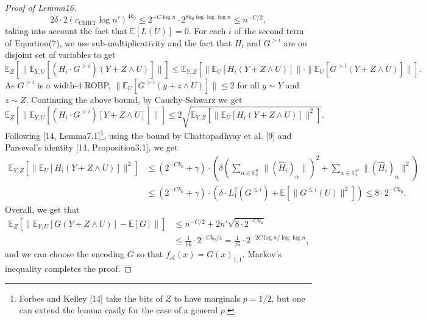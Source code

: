 \begin{proof}[Proof of Lemma16]
\[
2\delta\cdot2(c_{\mathrm{CHRT}}\log n')^{4k_0}
\le2^{-C\log n}\cdot2^{8k_0\log\log\log n}\le n^{-C/2},
\]
taking into account the fact that $\mathbb E[L(U)]=0$.
For each $i$ of the second term of Equation(7), we use sub-multiplicativity and the fact that $H_i$ and $G^{>i}$ are on disjoint set of variables to get
\[
\mathbb E_Z[\|\mathbb E_{Y,U}[(H_i\cdot G^{>i})(Y+Z\wedge U)]\|]
\le\mathbb E_{Y,Z}[\|\mathbb E_U[H_i(Y+Z\wedge U)]\|\cdot\|\mathbb E_U[G^{>i}(Y+Z\wedge U)]\|].
\]
As $G^{>i}$ is a width-4 ROBP, $\|\mathbb E_U[G^{>i}(y+z\wedge U)]\|\le2$ for all $y\sim Y$ and $z\sim Z$. Continuing the above bound, by Cauchy-Schwarz we get
\[
\mathbb E_Z[\|\mathbb E_{Y,U}[(H_i\cdot G^{>i})[Y+Z\wedge U]]\|]
\le2\sqrt{\mathbb E_{Y,Z}[\|\mathbb E_U[H_i(Y+Z\wedge U)]\|^2]}.
\]
Following [14, Lemma7.1]\footnote{Forbes and Kelley [14] take the bits of $Z$ to have marginals $p=1/2$, but one can extend the lemma easily for the case of a general $p$.}, using the bound by Chattopadhyay et al. [9] and Parseval's identity [14, Proposition3.1], we get
\begin{align*}
\mathbb E_{Y,Z}[\|\mathbb E_U[H_i(Y+Z\wedge U)]\|^2]
&\le(2^{-Ck_0}+\gamma)\cdot\left(\delta\left(\sum_{\alpha\in\mathbb F_2^{n'}}\|(\widehat H_i)_\alpha\|\right)^2+\sum_{\alpha\in\mathbb F_2^{n'}}\|(\widehat H_i)_\alpha\|^2\right)\\
&\le(2^{-Ck_0}+\gamma)\cdot\left(\delta\cdot L_1^2(G^{\le i})+\mathbb E[\|G^{\le i}(U)\|^2]\right)
\le8\cdot2^{-Ck_0}.
\end{align*}
Overall, we get that
\begin{align*}
\mathbb E_Z[\|\mathbb E_{Y,U}[G(Y+Z\wedge U)]-\mathbb E[G]\|]
&\le n^{-C/2}+2n'\sqrt{8\cdot2^{-Ck_0}}\\
&\le\frac1{16}\cdot2^{-Ck_0/4}
=\frac1{16}\cdot2^{-2C\log n/\log\log n},
\end{align*}
and we can choose the encoding $G$ so that $f_{\mathcal A}(x)=G(x)_{1,1}$. Markov's inequality completes the proof.
\end{proof}
